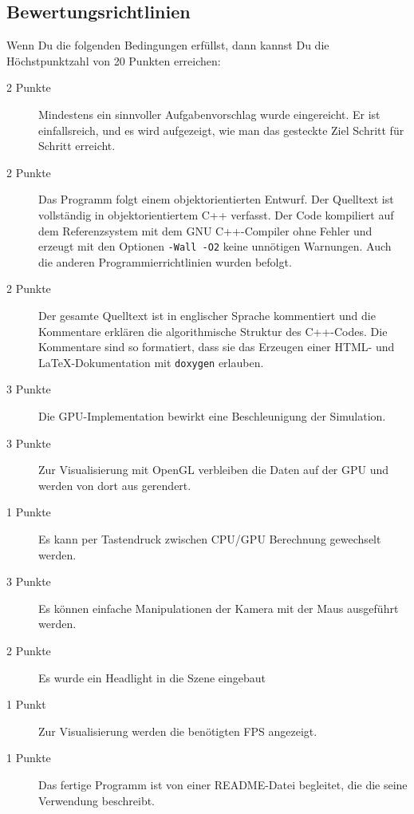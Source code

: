 \documentclass[10pt]{article}
\begin{document}
\begin{multicols}{2}
\section{Bewertungsrichtlinien}

Wenn Du die folgenden Bedingungen erfüllst, dann kannst Du die
Höchstpunktzahl von 20 Punkten erreichen:

\begin{description}
\item[2 Punkte]
        Mindestens ein sinnvoller Aufgabenvorschlag wurde eingereicht.
        Er ist einfallsreich, und es wird aufgezeigt, wie man das gesteckte Ziel
        Schritt für Schritt erreicht.
\item[2 Punkte]
        Das Programm folgt einem objektorientierten Entwurf.
        Der Quelltext ist vollständig in objektorientiertem C++ verfasst.
        Der Code kompiliert auf dem Referenzsystem mit dem GNU C++-Compiler
        ohne Fehler und erzeugt mit den Optionen \texttt{-Wall -O2} keine
        unnötigen Warnungen.
        Auch die anderen Programmierrichtlinien wurden befolgt.
\item[2 Punkte]
        Der gesamte Quelltext ist in englischer Sprache kommentiert und
        die Kommentare erklären die algorithmische Struktur des C++-Codes.
        Die Kommentare sind so formatiert, dass sie das Erzeugen einer
        HTML- und \LaTeX-Dokumentation mit \texttt{doxygen} erlauben. 
\item[3 Punkte] 
        Die GPU-Implementation bewirkt eine Beschleunigung der Simulation.
\item[3 Punkte] 
        Zur Visualisierung mit OpenGL verbleiben die Daten auf der GPU und werden von dort aus gerendert.
\item[1 Punkte]
        Es kann per Tastendruck zwischen CPU/GPU Berechnung gewechselt werden.
\item[3 Punkte] 
        Es können einfache Manipulationen der Kamera mit der Maus ausgeführt werden.
\item[2 Punkte]
        Es wurde ein Headlight in die Szene eingebaut
\item[1 Punkt]
        Zur Visualisierung werden die benötigten FPS angezeigt.
\item[1 Punkte] 
        Das fertige Programm ist von einer README-Datei begleitet, die die
        seine Verwendung beschreibt.

\end{description}




\nocite{*}


\end{multicols}
\end{document}
